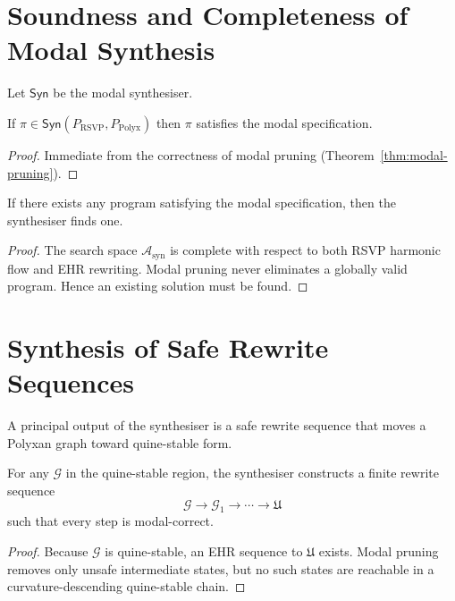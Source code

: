 \section{Soundness and Completeness of Modal Synthesis}
\label{sec:51:soundness-completeness}

Let $\mathsf{Syn}$ be the modal synthesiser.

\begin{theorem}
If $\pi \in \mathsf{Syn}(P_{\mathrm{RSVP}},P_{\mathrm{Polyx}})$ then
$\pi$ satisfies the modal specification.
\end{theorem}

\begin{proof}
Immediate from the correctness of modal pruning
(Theorem~\ref{thm:modal-pruning}).  
\end{proof}

\begin{theorem}
If there exists any program satisfying the modal specification, then the
synthesiser finds one.
\end{theorem}

\begin{proof}
The search space $\mathcal{A}_{\mathrm{syn}}$ is complete with respect to both
RSVP harmonic flow and EHR rewriting.  
Modal pruning never eliminates a globally valid program.  
Hence an existing solution must be found.  
\end{proof}


\section{Synthesis of Safe Rewrite Sequences}
\label{sec:51:rewrite-synthesis}

A principal output of the synthesiser is a safe rewrite sequence that moves a
Polyxan graph toward quine-stable form.

\begin{theorem}
\label{thm:51-safe-rewrite}
For any $\mathcal{G}$ in the quine-stable region, the synthesiser constructs a
finite rewrite sequence
\[
\mathcal{G} \to \mathcal{G}_1 \to \cdots \to \mathfrak{U}
\]
such that every step is modal-correct.
\end{theorem}

\begin{proof}
Because $\mathcal{G}$ is quine-stable, an EHR sequence to $\mathfrak{U}$ exists.
Modal pruning removes only unsafe intermediate states, but no such states are
reachable in a curvature-descending quine-stable chain.  
\end{proof}


